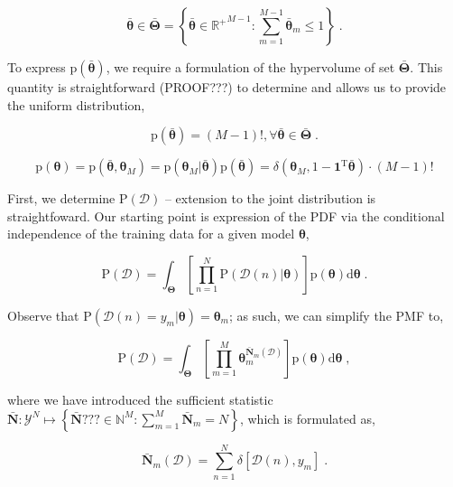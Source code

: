 \documentclass[12pt]{article}
\begin{document}
\begin{equation}
\bar{\bm{\theta}} \in \bar{\bm{\Theta}} = \left\{ \bar{\bm{\theta}} \in {\mathbb{R}^+}^{M-1}: \sum_{m=1}^{M-1} \bar{\bm{\theta}}_m \leq 1 \right\} \;.
\end{equation}

To express $\text{p}\left(\bar{\bm{\theta}}\right)$, we require a formulation of the hypervolume of set $\bar{\bm{\Theta}}$. This quantity is straightforward (PROOF???) to determine and allows us to provide the uniform distribution,

\begin{equation}
\text{p}\left(\bar{\bm{\theta}}\right)= (M-1)!,  \forall \bar{\bm{\theta}} \in \bar{\bm{\Theta}} \;.
\end{equation}

\begin{equation}
\text{p}(\bm{\theta}) = \text{p}(\bar{\bm{\theta}},\bm{\theta}_M) = \text{p}\left( \bm{\theta}_M | \bar{\bm{\theta}} \right) \text{p}\left(\bar{\bm{\theta}}\right)
= \delta\left( \bm{\theta}_M,1-\bm{1}^\text{T}\bar{\bm{\theta}} \right) \cdot  (M-1)!
\end{equation}

First, we determine $\text{P}(\mathcal{D})$ -- extension to the joint distribution is straightfoward. Our starting point is expression of the PDF via the conditional independence of the training data for a given model $\bm{\theta}$,

\begin{equation}
\text{P}(\mathcal{D}) = \int_{\bm{\Theta}} \left[ \prod_{n=1}^N \text{P}(\mathcal{D}(n) | \bm{\theta}) \right] \text{p}(\bm{\theta}) \mathrm{d}\bm{\theta} \;.
\end{equation}

Observe that $\text{P}(\mathcal{D}(n) = y_m | \bm{\theta}) = \bm{\theta}_m$; as such, we can simplify the PMF to,

\begin{equation}
\text{P}(\mathcal{D}) = \int_{\bm{\Theta}} \left[ \prod_{m=1}^M \bm{\theta}_m^{\bar{\bm{N}}_m(\mathcal{D})} \right] \text{p}(\bm{\theta}) \mathrm{d}\bm{\theta} \;,
\end{equation}

where we have introduced the sufficient statistic $\bar{\bm{N}}: \mathcal{Y}^N \mapsto \left\{ \bar{\bm{N}}??? \in \mathbb{N}^M: \sum_{m=1}^M \bar{\bm{N}}_m = N \right\}$, which is formulated as,

\begin{equation}
\bar{\bm{N}}_m(\mathcal{D}) = \sum_{n=1}^N \delta[\mathcal{D}(n),y_m] \;.
\end{equation}
\end{document}
